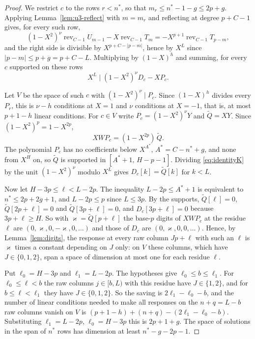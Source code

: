 \begin{proof}
We restrict $c$ to the rows $r<n^*$, so that $m_r\le n^*-1-g\le2p+g$. Applying Lemma~\ref{lem:u3-reflect}
with $m=m_r$ and reflecting at degree $p+C-1$ gives, for every such row,
\[
 (1-X^2)^\nu\operatorname{rev}_{C-1}U_{m-1}-X\operatorname{rev}_{C-1}T_m=-X^{p+1}\operatorname{rev}_{C-1}T_{p-m},
\]
and the right side is divisible by $X^{p+C-|p-m|}$, hence by $X^L$ since $|p-m|\le p+g=p+C-L$. Multiplying
by $(1-X)^h$ and summing, for every $c$ supported on these rows
\begin{equation}\label{eq:identityK}
 X^L\mid(1-X^2)^\nu D_c-XP_c .
\end{equation}

Let $V$ be the space of such $c$ with $(1-X^2)^\nu\mid P_c$. Since $(1-X)^h$ divides every $P_r$, this is
$\nu-h$ conditions at $X=1$ and $\nu$ conditions at $X=-1$, that is, at most $p+1-h$ linear conditions.
For $c\in V$ write $P_c=(1-X^2)^\nu Y$ and $\widetilde Q=XY$. Since $(1-X^2)^p=1-X^{2p}$,
\[
 XWP_c=(1-X^{2p})\,\widetilde Q .
\]
The polynomial $P_c$ has no coefficients below $X^{A^*}$, $A^*=C-n^*+g$, and none from $X^H$ on, so
$\widetilde Q$ is supported in $[A^*+1,\,H-p-1]$. Dividing \eqref{eq:identityK} by the unit
$(1-X^2)^\nu$ modulo $X^L$ gives $D_c[k]=\widetilde Q[k]$ for $k<L$.

Now let $H-3p\le\ell<L-2p$. The inequality $L-2p\le A^*+1$ is equivalent to $n^*\le2p+2g+1$, and
$L-2p\le p$ since $L\le3p$. By the supports, $\widetilde Q[\ell]=0$, $\widetilde Q[2p+\ell]=0$ and
$\widetilde Q[3p+\ell]=0$, and $D_c[3p+\ell]=0$ because $3p+\ell\ge H$. So with
$\varkappa=\widetilde Q[p+\ell]$ the base-$p$ digits of $XWP_c$ at the residue $\ell$ are
$(0,\varkappa,0,-\varkappa,0,\dots)$ and those of $D_c$ are $(0,\varkappa,0,0,\dots)$. Hence, by
Lemma~\ref{lem:digits}, the response at every raw column $Jp+\ell$ with such an $\ell$ is $\varkappa$ times
a constant depending on $J$ only: on $V$ these columns, which have $J\in\{0,1,2\}$, span a space of
dimension at most one for each residue $\ell$.

Put $\ell_0=H-3p$ and $\ell_1=L-2p$. The hypotheses give $\ell_0\le b\le\ell_1$. For $\ell_0\le\ell<b$ the raw
columns $j\in[b,L)$ with this residue have $J\in\{1,2\}$, and for $b\le\ell<\ell_1$ they have
$J\in\{0,1,2\}$. So the saving is $2\ell_1-\ell_0-b$, and the number of linear conditions needed to make all
responses on the $n+q=L-b$ raw columns vanish on $V$ is
$(p+1-h)+(n+q)-(2\ell_1-\ell_0-b)$. Substituting $\ell_1=L-2p$, $\ell_0=H-3p$ this is $2p+1+g$. The space of
solutions in the span of $n^*$ rows has dimension at least $n^*-g-2p-1$.
\end{proof}

